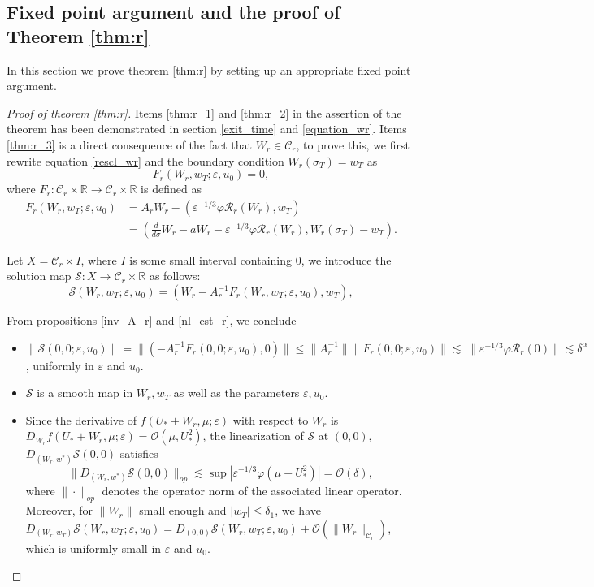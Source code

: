\documentclass[letterpaper,11pt]{article}
\newcommand{\Ral}{\mathcal{R}}
\newcommand{\rmO}{\mathcal{O}}
\newcommand{\eps}{\varepsilon}
\newcommand{\lar}{ \lesssim }
\numberwithin{equation}{section}
\theoremstyle{plain}
\begin{document}
\subsection{Fixed point argument and the proof of Theorem \ref{thm:r}}
In this section we prove theorem \ref{thm:r} by setting up an appropriate fixed point argument.
\begin{proof}[Proof of theorem \ref{thm:r}]
Items \ref{thm:r_1} and \ref{thm:r_2} in the assertion of the theorem has been demonstrated in section \ref{exit_time} and \ref{equation_wr}. Items \ref{thm:r_3} is a direct consequence of the fact that $W_r \in \mathcal{C}_r$, to prove this, we first rewrite equation \eqref{rescl_wr} and the boundary condition $W_r(\sigma_T)=w_T$ as 
\[
F_r(W_r, w_T; \eps, u_0) = 0,
\]
where $F_r : \mathcal{C}_r\times \mathbb{R} \to \mathcal{C}_r\times \mathbb{R}$ is defined as
\begin{align*}
F_r(W_r,w_T;\eps,u_0) &= A_rW_r - \left(\eps^{-1/3}\varphi \Ral_r(W_r), w_T \right)\\
&=\left( \frac{d}{d\sigma}W_r-aW_r - \eps^{-1/3}\varphi \Ral_r(W_r), W_r(\sigma_T)-w_T \right).
\end{align*} 


Let $X = \mathcal{C}_r \times I$, where $I$ is some small interval containing $0$, we introduce the solution map $\mathcal{S}: X \to \mathcal{C}_r\times \mathbb{R}$ as follows:
\[
\mathcal{S}(W_r,w_T; \eps, u_0) = (W_r-A_r^{-1}F_r(W_r,w_T;\eps, u_0), w_T),
\]

From propositions \ref{inv_A_r} and \ref{nl_est_r}, we conclude 
\begin{itemize}
\item $\|\mathcal{S}(0,0;\eps,u_0) \|= \|\left( -A_r^{-1}F_r(0,0;\eps,u_0),0\right)\| \le \|A_r^{-1}\|\|F_r(0,0;\eps,u_0)\| \lar |\|\eps^{-1/3}\varphi \Ral_r(0)\| \lar \delta^\alpha$, uniformly in $\eps$ and $u_0$.

\item $\mathcal{S}$ is a smooth map in $W_r,w_T$ as well as the parameters $\eps, u_0$.

\item Since the derivative of $f(U_*+W_r,\mu;\eps)$ with respect to $W_r$ is $D_{W_r} f(U_*+W_r,\mu;\eps)=\rmO(\mu, U_*^2)$, the linearization of $\mathcal{S}$ at $(0,0)$, $D_{(W_r,w^*)} \mathcal{S}(0,0)$ satisfies
\[
\|D_{(W_r,w^*)} \mathcal{S}(0,0)\|_{op} \lar \sup|\eps^{-1/3}\varphi(\mu+U_*^2)| = \rmO(\delta),
\]
where $\|\cdot\|_{op}$ denotes the operator norm of the associated linear operator.
Moreover, for $\|W_r\|$ small enough and $|w_T|\le \delta_1$, we have $D_{(W_r,w_T)}\mathcal{S}(W_r,w_T;\eps,u_0) =  D_{(0,0)}\mathcal{S}(W_r,w_T;\eps,u_0)+\rmO(\|W_r\|_{\mathcal{C}_r})$, which is uniformly small in $\eps$ and $u_0$.


\end{itemize}
\end{proof}
\end{document}
